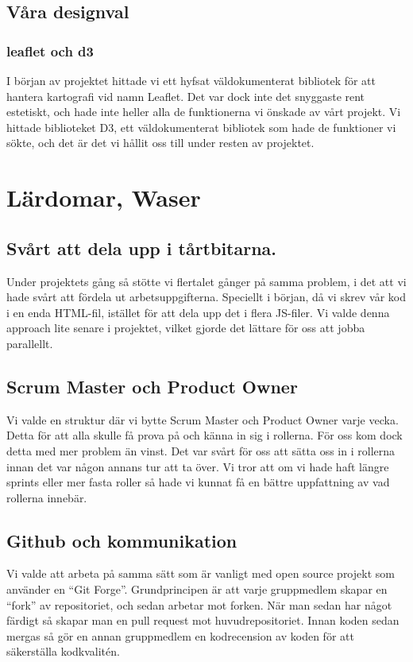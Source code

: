 \documentclass[]{article}
\begin{document}
\subsection{Våra designval}

\subsubsection{leaflet och d3}
I början av projektet hittade vi ett hyfsat väldokumenterat bibliotek för att hantera kartografi vid namn Leaflet. Det var dock inte det snyggaste rent estetiskt, och hade inte heller alla de funktionerna vi önskade av vårt projekt. Vi hittade biblioteket D3, ett väldokumenterat bibliotek som hade de funktioner vi sökte, och det är det vi hållit oss till under resten av projektet.

\section{Lärdomar, \textbf{Waser}}
\subsection{Svårt att dela upp i tårtbitarna. }
Under projektets gång så stötte vi flertalet gånger på samma problem, i det att vi hade svårt att fördela ut arbetsuppgifterna. Speciellt i början, då vi skrev vår kod i en enda HTML-fil, istället för att dela upp det i flera JS-filer. Vi valde denna approach lite senare i projektet, vilket gjorde det lättare för oss att jobba parallellt.

\subsection{Scrum Master och Product Owner}
Vi valde en struktur där vi bytte Scrum Master och Product Owner varje vecka. Detta för att alla skulle få prova på och känna in sig i rollerna. För oss kom dock detta med mer problem än vinst. Det var svårt för oss att sätta oss in i rollerna innan det var någon annans tur att ta över. Vi tror att om vi hade haft längre sprints eller mer fasta roller så hade vi kunnat få en bättre uppfattning av vad rollerna innebär. 

\subsection{Github och kommunikation}

Vi valde att arbeta på samma sätt som är vanligt med open source projekt som använder en ``Git Forge''.
Grundprincipen är att varje gruppmedlem skapar en ``fork'' av repositoriet, och sedan arbetar mot forken.
När man sedan har något färdigt så skapar man en pull request mot huvudrepositoriet.
Innan koden sedan mergas så gör en annan gruppmedlem en kodrecension av koden för att säkerställa kodkvalitén.
\end{document}
